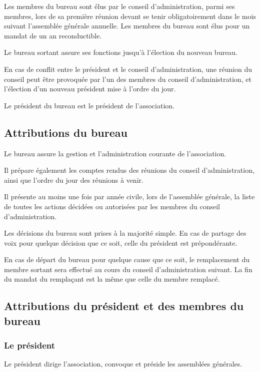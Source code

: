 \documentclass[a4wide,12pt]{scrartcl}
\begin{document}
Les membres du bureau sont élus par le conseil d'administration, parmi
ses membres, lors de sa première réunion devant se tenir
obligatoirement dans le mois suivant l'assemblée générale
annuelle. Les membres du bureau sont élus pour un mandat de un an
reconductible.

Le bureau sortant assure ses fonctions jusqu'à l'élection du nouveau
bureau.

En cas de conflit entre le président et le conseil d'administration,
une réunion du conseil peut être provoquée par l'un des membres du
conseil d'administration, et l'élection d'un nouveau président mise à
l'ordre du jour.

Le président du bureau est le président de l'association.

\subsection{Attributions du bureau}

Le bureau assure la gestion et l'administration courante de
l'association.

Il prépare également les comptes rendus des réunions du conseil
d'administration, ainsi que l'ordre du jour des réunions à venir.

Il présente au moins une fois par année civile, lors de l'assemblée
générale, la liste de toutes les actions décidées ou autorisées par
les membres du conseil d'administration.

Les décisions du bureau sont prises à la majorité simple. En cas de
partage des voix pour quelque décision que ce soit, celle du président
est prépondérante.

En cas de départ du bureau pour quelque cause que ce soit, le
remplacement du membre sortant sera effectué au cours du conseil
d'administration suivant. La fin du mandat du remplaçant est la même
que celle du membre remplacé.
 
\subsection{Attributions du président et des membres du bureau}

\subsubsection*{Le président}

Le président dirige l'association, convoque et préside les assemblées
générales.
\end{document}
